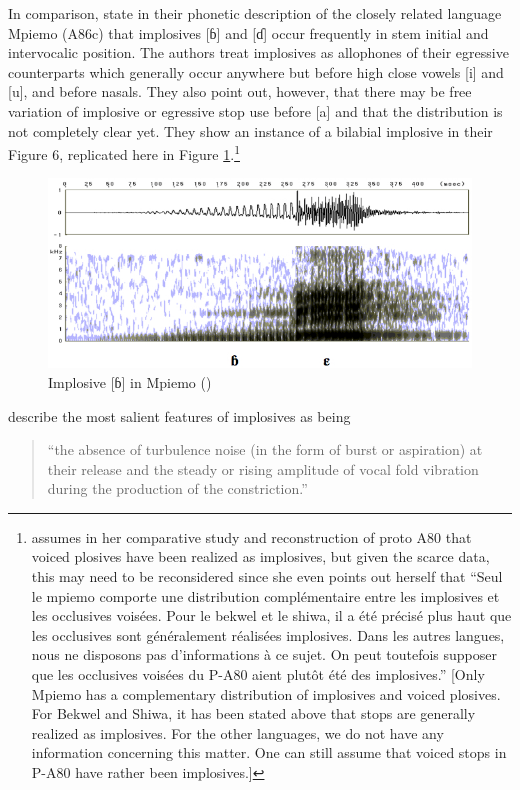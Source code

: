 In comparison, \citet[173]{thornell2004} state in their phonetic description of the closely related language Mpiemo (A86c) that implosives [ɓ] and [ɗ] occur frequently in stem initial and intervocalic position. The authors treat implosives as allophones of their egressive counterparts which generally occur anywhere but before high close vowels [i] and [u], and before nasals. They also point out, however, that there may be free variation of implosive or egressive stop use before [a] and that the distribution is not completely clear yet.  They show an instance of a bilabial implosive in their Figure 6, replicated here in Figure \ref{Fig:mpiemo}.\footnote{\citet[461]{cheucle2014} assumes in her comparative study and reconstruction of proto A80 that voiced plosives have been realized as implosives, but given the scarce data, this may need to be reconsidered since she even points out herself that ``Seul le mpiemo comporte une distribution complémentaire entre les implosives et les occlusives voisées. Pour le bekwel et le shiwa, il a été précisé plus haut que les occlusives sont généralement réalisées implosives. Dans les autres langues, nous ne disposons pas d’informations à ce sujet. On peut toutefois supposer que les occlusives voisées du P-A80 aient plutôt été des implosives.'' [Only Mpiemo has a complementary distribution of implosives and voiced plosives. For Bekwel and Shiwa, it has been stated above that stops are generally realized as implosives. For the other languages, we do not have any information concerning this matter. One can still assume that voiced stops in P-A80 have rather been implosives.]}

\begin{figure} 
\centering
\includegraphics[width=\textwidth]{figures/mpiemoB}
\caption{Implosive [ɓ] in Mpiemo (\citet[172]{thornell2004})}
\label{Fig:mpiemo}
\end{figure}

\citet[312]{clements2002} describe the most salient features of implosives as being  \begin{quote} ``the absence of turbulence noise (in the form of burst or aspiration) at their release and the steady or rising amplitude of vocal fold vibration during the production of the constriction.'' \end{quote}

